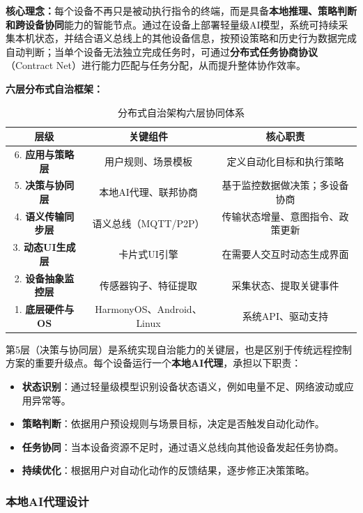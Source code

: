 \documentclass[12pt,a4paper]{article}
\begin{document}
\textbf{核心理念：}每个设备不再只是被动执行指令的终端，而是具备\textbf{本地推理、策略判断和跨设备协同}能力的智能节点。通过在设备上部署轻量级AI模型，系统可持续采集本机状态，并结合语义总线上的其他设备信息，按预设策略和历史行为数据完成自动判断；当单个设备无法独立完成任务时，可通过\textbf{分布式任务协商协议}（Contract Net）进行能力匹配与任务分配，从而提升整体协作效率。

\textbf{六层分布式自治框架：}

\begin{table}[H]
\centering
\small
\begin{tabular}{|c|c|c|}
\hline
\textbf{层级} & \textbf{关键组件} & \textbf{核心职责} \\
\hline
6. \textbf{应用与策略层} & 用户规则、场景模板 & 定义自动化目标和执行策略 \\
\hline
5. \textbf{决策与协同层} & 本地AI代理、联邦协商 & 基于监控数据做决策；多设备协商 \\
\hline
4. \textbf{语义传输同步层} & 语义总线（MQTT/P2P） & 传输状态增量、意图指令、政策更新 \\
\hline
3. \textbf{动态UI生成层} & 卡片式UI引擎 & 在需要人交互时动态生成界面 \\
\hline
2. \textbf{设备抽象监控层} & 传感器钩子、特征提取 & 采集状态、提取关键事件 \\
\hline
1. \textbf{底层硬件与OS} & HarmonyOS、Android、Linux & 系统API、驱动支持 \\
\hline
\end{tabular}
\caption{分布式自治架构六层协同体系}
\end{table}

第5层（决策与协同层）是系统实现自治能力的关键层，也是区别于传统远程控制方案的重要升级点。每个设备运行一个\textbf{本地AI代理}，承担以下职责：

\begin{itemize}[noitemsep]
  \item \textbf{状态识别}：通过轻量级模型识别设备状态语义，例如电量不足、网络波动或应用异常等。
  \item \textbf{策略判断}：依据用户预设规则与场景目标，决定是否触发自动化动作。
  \item \textbf{任务协同}：当本设备资源不足时，通过语义总线向其他设备发起任务协商。
  \item \textbf{持续优化}：根据用户对自动化动作的反馈结果，逐步修正决策策略。
\end{itemize}

\subsubsection{本地AI代理设计}
\end{document}
